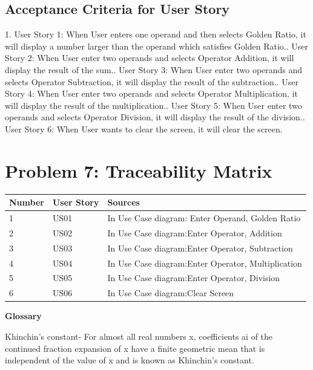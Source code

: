 \documentclass[12pt]{extarticle}
\begin{document}
\subsection{Acceptance Criteria for User Story}
1. User Story 1: When User enters one operand and then selects Golden Ratio, it will display a number larger than the operand which satisfies Golden Ratio.. User Story 2: When User enter two operands and selects Operator Addition, it will display the result of the sum.. User Story 3: When User enter two operands and selects Operator Subtraction, it will display the result of the subtraction.. User Story 4: When User enter two operands and selects Operator Multiplication, it will display the result of the multiplication.. User Story 5: When User enter two operands and selects Operator Division, it will display the result of the division.. User Story 6: When User wants to clear the screen, it will clear the screen.\newline
\newpage
\section{Problem 7: Traceability Matrix}
\begin{table}[h]
\centering
\begin{tabular}{|p{2cm}|p{2cm}|p{6cm}|}
\hline
Number & User Story & Sources \\
\hline
1 & US01 & In Use Case diagram: Enter Operand, Golden Ratio \\
\hline
2 & US02 & In Use Case diagram:Enter Operator, Addition  \\
\hline
 3 & US03 & In Use Case diagram:Enter Operator, Subtraction \\
\hline
4 & US04 & In Use Case diagram:Enter Operator, Multiplication  \\
\hline
5 & US05 & In Use Case diagram:Enter Operator, Division\\
\hline
6 & US06 & In Use Case diagram:Clear Screen \\
\hline
\end{tabular}
\end{table}
\newpage

\begin{center}
    \textbf{Glossary}
\end{center}
Khinchin's constant-  For almost all real numbers x, coefficients ai of the continued fraction expansion of x have a finite geometric mean that is independent of the value of x and is known as Khinchin's constant.\newline\newline



\newpage


\end{document}
